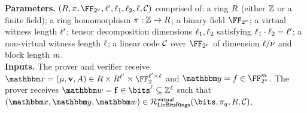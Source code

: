 \documentclass[11pt,letterpaper,usenames,dvipsnames]{article}
\begin{document}
\begin{construction}\label{c:virtual_iop}
\textbf{Parameters.} $(\evalfield,\ringmorphism,\comfield,\codedim',\codedim_1,\codedim_2, \codedim, \cC)$ comprised of: a ring $R$ (either $\mathbb{Z}$ or a finite field); a ring homomorphism $\pi:\mathbb{Z} \to R$; a binary field $\comfield$; a virtual witness length $\ell'$; tensor decomposition dimensions $\ell_1, \ell_2$ satisfying $\ell_1\cdot \ell_2 = \ell'$; a non-virtual witness length $\ell$; a linear code $\mathcal{C}$ over $\comfield$ of dimension $\ell/\nu$ and block length $m$.\\ 

\noindent \textbf{Inputs.}
The prover and verifier receive $\inp=(\mu, \vv,\Mmatrix)\in \evalfield \times \evalfield^{\codedim'} \times \FF_2^{\codedim'\times\codedim}$ and  $\oracle= f \in \comfield^\codelength$. The prover receives $\wit= \bff\in \bits^\codedim \subseteq \ZZ^\codedim$ such that $(\inp,\oracle, \wit) \in \LinBitsDual^\virtual(\bits,\pi_q, \evalfield,\cC)$.  %




\end{construction}
\end{document}
